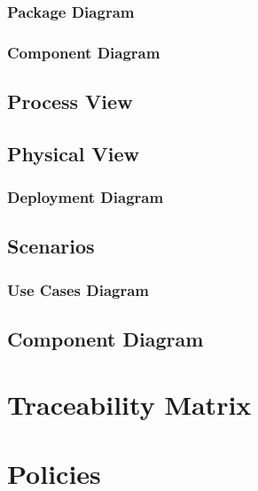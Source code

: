\documentclass[12pt]{article}
\begin{document}
	\subsubsection{Package Diagram}



	\subsubsection{Component Diagram}



	\subsection{Process View}



	\subsection {Physical View}


	
	\subsubsection{Deployment Diagram}



	\subsection{Scenarios}

	\subsubsection{Use Cases Diagram}


	\subsection {Component Diagram}


	\section{Traceability Matrix}



\lstset{language=Java}

\section{Policies}
\end{document}
